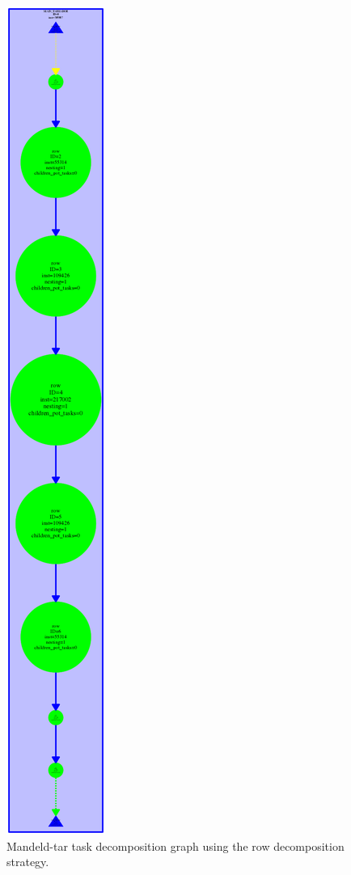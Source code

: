 \documentclass[12pt, a4paper]{article}
\begin{document}
\begin{figure}[H]
	\centering
	\includegraphics[scale=0.106]{./mandeld-tar_row}
	\caption{Mandeld-tar task decomposition graph using the row decomposition strategy.}
	\label{fig:mandeld-tar-row}
\end{figure}
\end{document}

